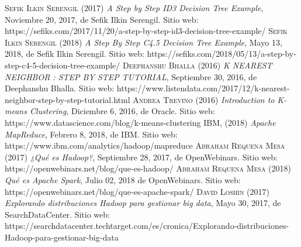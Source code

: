 \begin{thebibliography}{}
	 \textsc{Sefik Ilkin Serengil} (2017) \textit{A Step by Step ID3 Decision Tree Example}, Noviembre 20, 2017, de Sefik Ilkin Serengil. Sitio web: https://sefiks.com/2017/11/20/a-step-by-step-id3-decision-tree-example/
	 \textsc{Sefik Ilkin Serengil} (2018) \textit{A Step By Step C4.5 Decision Tree Example}, Mayo 13, 2018, de Sefik Ilkin Serengil. Sitio web: https://sefiks.com/2018/05/13/a-step-by-step-c4-5-decision-tree-example/
	 \textsc{Deephanshu Bhalla} (2016) \textit{K NEAREST NEIGHBOR : STEP BY STEP TUTORIAL}, Septiembre 30, 2016, de Deephanshu Bhalla. Sitio web: https://www.listendata.com/2017/12/k-nearest-neighbor-step-by-step-tutorial.html
	 \textsc{Andrea Trevino} (2016) \textit{Introduction to K-means Clustering}, Diciembre 6, 2016, de Oracle. Sitio web: https://www.datascience.com/blog/k-means-clustering
	 \textsc{IBM}, (2018) \textit{Apache MapReduce}, Febrero 8, 2018, de IBM. Sitio web: https://www.ibm.com/analytics/hadoop/mapreduce
	 \textsc{Abraham Requena Mesa} (2017) \textit{¿Qué es Hadoop?}, Septiembre 28, 2017, de OpenWebinars. Sitio web: https://openwebinars.net/blog/que-es-hadoop/
	 \textsc{Abraham Requena Mesa} (2018) \textit{Qué es Apache Spark}, Julio 02, 2018 de OpenWebinars. Sitio web: https://openwebinars.net/blog/que-es-apache-spark/
	 \textsc{David Loshin} (2017) \textit{Explorando distribuciones Hadoop para gestionar big data}, Mayo 30, 2017, de SearchDataCenter. Sitio web: https://searchdatacenter.techtarget.com/es/cronica/Explorando-distribuciones-Hadoop-para-gestionar-big-data

\end{thebibliography}
